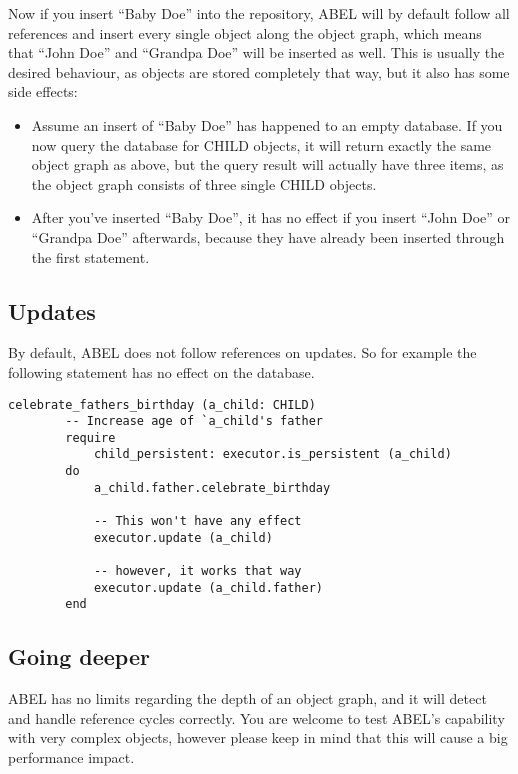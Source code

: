 Now if you insert ``Baby Doe'' into the repository, ABEL will by default follow all references and insert every single object along the object graph, which means that ``John Doe'' and ``Grandpa Doe'' will be inserted as well.
This is usually the desired behaviour, as objects are stored completely that way, but it also has some side effects:

\begin{itemize}
\item Assume an insert of ``Baby Doe'' has happened to an empty database. 
If you now query the database for CHILD objects, it will return exactly the same object graph as above, but the query result will actually have three items, as the object graph consists of three single CHILD objects.
	
\item After you've inserted ``Baby Doe'', it has no effect if you insert ``John Doe'' or ``Grandpa Doe'' afterwards, because they have already been inserted through the first statement.
\end{itemize}

\subsection{Updates}

By default, ABEL does not follow references on updates. So for example the following statement has no effect on the database.

\begin{lstlisting}[language=OOSC2Eiffel, captionpos=b, caption={}, label={lst:reference_update}]
	celebrate_fathers_birthday (a_child: CHILD)
		-- Increase age of `a_child's father
		require
			child_persistent: executor.is_persistent (a_child)
		do
			a_child.father.celebrate_birthday

			-- This won't have any effect
			executor.update (a_child)

			-- however, it works that way
			executor.update (a_child.father)
		end
\end{lstlisting}

\subsection{Going deeper}

ABEL has no limits regarding the depth of an object graph, and it will detect and handle reference cycles correctly. 
You are welcome to test ABEL's capability with very complex objects, however please keep in mind that this will cause a big performance impact.

